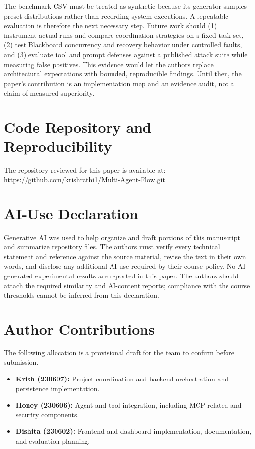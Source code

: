 \documentclass[12pt,onecolumn,draftclsnofoot]{IEEEtran}
\begin{document}
The benchmark CSV must be treated as synthetic because its generator samples preset distributions rather than recording system executions. A repeatable evaluation is therefore the next necessary step. Future work should (1) instrument actual runs and compare coordination strategies on a fixed task set, (2) test Blackboard concurrency and recovery behavior under controlled faults, and (3) evaluate tool and prompt defenses against a published attack suite while measuring false positives. This evidence would let the authors replace architectural expectations with bounded, reproducible findings. Until then, the paper's contribution is an implementation map and an evidence audit, not a claim of measured superiority.
\section*{Code Repository and Reproducibility}
The repository reviewed for this paper is available at:\\
\url{https://github.com/krishrathi1/Multi-Agent-Flow.git}

\section*{AI-Use Declaration}
Generative AI was used to help organize and draft portions of this manuscript and summarize repository files. The authors must verify every technical statement and reference against the source material, revise the text in their own words, and disclose any additional AI use required by their course policy. No AI-generated experimental results are reported in this paper. The authors should attach the required similarity and AI-content reports; compliance with the course thresholds cannot be inferred from this declaration.

\section*{Author Contributions}
The following allocation is a provisional draft for the team to confirm before submission.
\begin{itemize}
    \item \textbf{Krish (230607):} Project coordination and backend orchestration and persistence implementation.
    \item \textbf{Honey (230606):} Agent and tool integration, including MCP-related and security components.
    \item \textbf{Dishita (230602):} Frontend and dashboard implementation, documentation, and evaluation planning.
\end{itemize}



\end{document}

